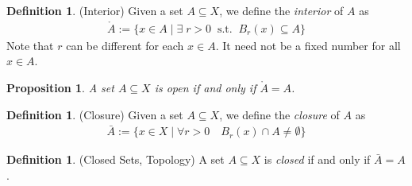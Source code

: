 \documentclass[12pt]{book}
\numberwithin{equation}{section} %
\theoremstyle{plain}
\newtheorem{prop}[thm]{Proposition}
\theoremstyle{definition}
\newtheorem{defn}[thm]{Definition}
\theoremstyle{remark}
\begin{document}
\begin{defn}{(Interior)}
Given a set $A\subseteq X$, we define the \emph{interior} of $A$ as
\begin{align*}
  \mathring{A}
  := \{x \in A \; | \; \exists\; r>0 \;\; \text{s.t.} \;\; B_r(x) \subseteq A\}
\end{align*}
Note that $r$ can be different for each $x\in A$. It need not be a fixed
number for all $x\in A$.
\end{defn}

\begin{prop}
A set $A\subseteq X$ is open if and only if $\mathring{A} = A$.
\end{prop}

\begin{defn}{(Closure)}
Given a set $A\subseteq X$, we define the \emph{closure} of $A$ as
\begin{align*}
  \bar{A}:= \{
    x\in X \;|\;
    \forall r>0 \quad B_r(x) \cap A \neq \emptyset
  \}
\end{align*}
\end{defn}

\begin{defn}{(Closed Sets, Topology)}
\label{defn:closed}
A set $A\subseteq X$ is \emph{closed} if and only if $\bar{A} = A$.
\end{defn}
\end{document}
